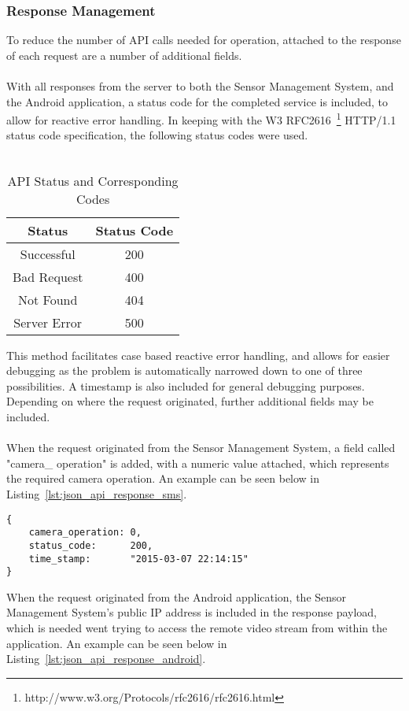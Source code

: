 \documentclass{article}
\begin{document}
\subsubsection{Response Management}
\label{sssec:api_response_mgmt}
To reduce the number of API calls needed for operation, attached to the response of each request are a number of additional fields. \\\\
With all responses from the server to both the Sensor Management System, and the Android application, a status code for the completed service is included, to allow for reactive error handling. In keeping with the W3 RFC2616~\footnote{http://www.w3.org/Protocols/rfc2616/rfc2616.html} HTTP/1.1 status code specification, the following status codes were used. \\\\
\begin{table}[H]
\def\arraystretch{1.5}%
\begin{center}
 \begin{tabular}{|| c | c ||} 
 \hline
 \textbf{Status} & \textbf{Status Code}  \\ [0.5ex] 
 \hline\hline
 Successful & 200 \\ 
 \hline
 Bad Request & 400 \\
 \hline
 Not Found & 404 \\
 \hline
 Server Error & 500 \\ [1ex] 
 \hline
 
\end{tabular}
\end{center}
\caption{API Status and Corresponding Codes}
\end{table}
\noindent
This method facilitates case based reactive error handling, and allows for easier debugging as the problem is automatically narrowed down to one of three possibilities. A timestamp is also included for general debugging purposes. Depending on where the request originated, further additional fields may be included. \\\\
When the request originated from the Sensor Management System, a field called "camera\_ operation" is added, with a numeric value attached, which represents the required camera operation. An example can be seen below in Listing~\ref{lst:json_api_response_sms}.
\begin{lstlisting}[caption={JSON API response to Sensor Management System},label={lst:json_api_response_sms}]
{
	camera_operation: 0,
	status_code:      200, 
	time_stamp:       "2015-03-07 22:14:15"
}
\end{lstlisting}
When the request originated from the Android application, the Sensor Management System\rq s public IP address is included in the response payload, which is needed went trying to access the remote video stream from within the application. An example can be seen below in Listing~\ref{lst:json_api_response_android}.
\end{document}
